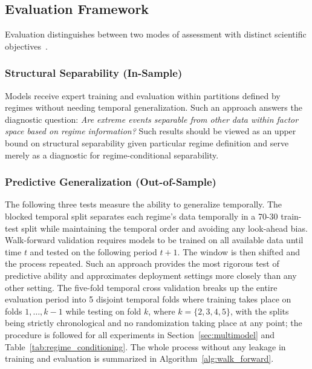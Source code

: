 \documentclass[]{interact}
\begin{document}
\subsection{Evaluation Framework}
\label{subsec:eval_framework}

Evaluation distinguishes between two modes of assessment with distinct scientific objectives~\citep{liu2024times, chandola2009anomaly}.

\subsubsection{Structural Separability (In-Sample)}
\label{subsubsec:in_sample}

Models receive expert training and evaluation within partitions defined by regimes without needing temporal generalization. Such an approach answers the diagnostic question: \emph{Are extreme events separable from other data within factor space based on regime information?} Such results should be viewed as an upper bound on structural separability given particular regime definition and serve merely as a diagnostic for regime-conditional separability.

\subsubsection{Predictive Generalization (Out-of-Sample)}
\label{subsubsec:out_of_sample}

The following three tests measure the ability to generalize temporally. The blocked temporal split separates each regime's data temporally in a 70-30 train-test split while maintaining the temporal order and avoiding any look-ahead bias. Walk-forward validation requires models to be trained on all available data until time $t$ and tested on the following period $t{+}1$. The window is then shifted and the process repeated. Such an approach provides the most rigorous test of predictive ability and approximates deployment settings more closely than any other setting. The five-fold temporal cross validation breaks up the entire evaluation period into 5 disjoint temporal folds where training takes place on folds $1, \ldots, k - 1$ while testing on fold $k$, where $k = \{2,3,4,5\}$, with the splits being strictly chronological and no randomization taking place at any point; the procedure is followed for all experiments in Section~\ref{sec:multimodel} and Table~\ref{tab:regime_conditioning}. The whole process without any leakage in training and evaluation is summarized in Algorithm~\ref{alg:walk_forward}.
\end{document}
